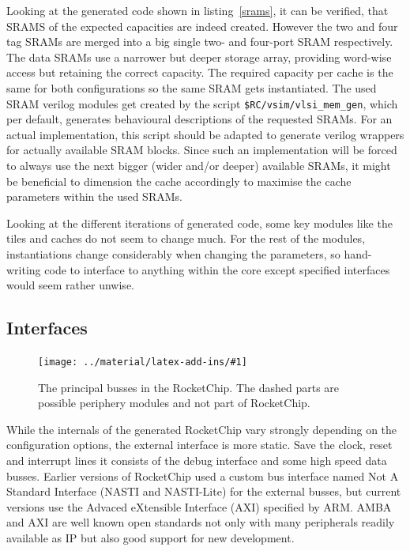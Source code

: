 \documentclass[journal,a4paper]{IEEEtran}
\newcommand*{\COMPILEIMAGES}{}%
\newcommand\inputimage[1]{%
	\ifdefined\COMPILEIMAGES
		
	\else
		\texttt{[image: ../material/latex-add-ins/\#1]}
	\fi
}
\begin{document}
Looking at the generated code shown in listing~\ref{srams}, it can be verified, that SRAMS of the expected capacities are indeed created.
However the two and four tag SRAMs are merged into a big single two- and four-port SRAM respectively.
The data SRAMs use a narrower but deeper storage array, providing word-wise access but retaining the correct capacity. The required capacity per cache is the same for both configurations so the same SRAM gets instantiated.
The used SRAM verilog modules get created by the script \texttt{\$RC/vsim/vlsi\_mem\_gen}, which per default, generates behavioural descriptions of the requested SRAMs.
For an actual implementation, this script should be adapted to generate verilog wrappers for actually available SRAM blocks.
Since such an implementation will be forced to always use the next bigger (wider and/or deeper) available SRAMs, it might be beneficial to dimension the cache accordingly to maximise the cache parameters within the used SRAMs.

Looking at the different iterations of generated code, some key modules like the tiles and caches do not seem to change much.
For the rest of the modules, instantiations change considerably when changing the parameters, so hand-writing code to interface to anything within the core except specified interfaces would seem rather unwise.


\subsection{Interfaces}

\begin{figure}%
	\centering
	\inputimage{image4}
	\caption{The principal busses in the RocketChip. The dashed parts are possible periphery modules and not part of RocketChip.}
	\label{busses}
\end{figure}
While the internals of the generated RocketChip vary strongly depending on the configuration options, the external interface is more static.
Save the clock, reset and interrupt lines it consists of the debug interface and some high speed data busses.
Earlier versions of RocketChip used a custom bus interface named Not A Standard Interface (NASTI and NASTI-Lite) for the external busses, but current versions use the Advaced eXtensible Interface (AXI) specified by ARM\cite{axi}.
AMBA and AXI are well known open standards not only with many peripherals readily available as IP but also good support for new development\cite{axi-tools}.
\end{document}
